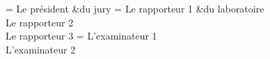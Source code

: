\ThesisUL
\President = {Le président &du jury}
\Rapporteurs = {Le rapporteur 1 &du laboratoire\\
Le rapporteur 2\\
Le rapporteur 3}
\Examinateurs = {L’examinateur 1\\
L’examinateur 2}
\MakeThesisTitlePage